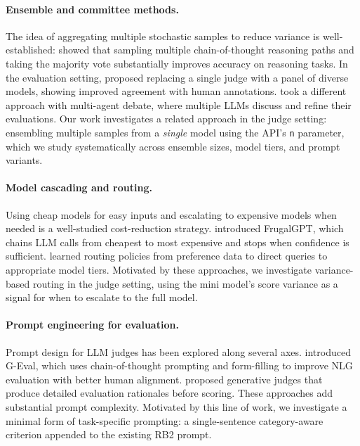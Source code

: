 \documentclass{article}
\begin{document}
\paragraph{Ensemble and committee methods.} The idea of aggregating multiple stochastic samples to reduce variance is well-established: \citet{wang2023selfconsistency} showed that sampling multiple chain-of-thought reasoning paths and taking the majority vote substantially improves accuracy on reasoning tasks. In the evaluation setting, \citet{verga2024replacing} proposed replacing a single judge with a panel of diverse models, showing improved agreement with human annotations. \citet{chan2024chateval} took a different approach with multi-agent debate, where multiple LLMs discuss and refine their evaluations. Our work investigates a related approach in the judge setting: ensembling multiple samples from a \emph{single} model using the API's \texttt{n} parameter, which we study systematically across ensemble sizes, model tiers, and prompt variants.

\paragraph{Model cascading and routing.} Using cheap models for easy inputs and escalating to expensive models when needed is a well-studied cost-reduction strategy. \citet{chen2024frugalgpt} introduced FrugalGPT, which chains LLM calls from cheapest to most expensive and stops when confidence is sufficient. \citet{ong2025routellm} learned routing policies from preference data to direct queries to appropriate model tiers. Motivated by these approaches, we investigate variance-based routing in the judge setting, using the mini model's score variance as a signal for when to escalate to the full model.

\paragraph{Prompt engineering for evaluation.} Prompt design for LLM judges has been explored along several axes. \citet{liu2023geval} introduced G-Eval, which uses chain-of-thought prompting and form-filling to improve NLG evaluation with better human alignment. \citet{li2024generative} proposed generative judges that produce detailed evaluation rationales before scoring. These approaches add substantial prompt complexity. Motivated by this line of work, we investigate a minimal form of task-specific prompting: a single-sentence category-aware criterion appended to the existing RB2 prompt.
\end{document}
